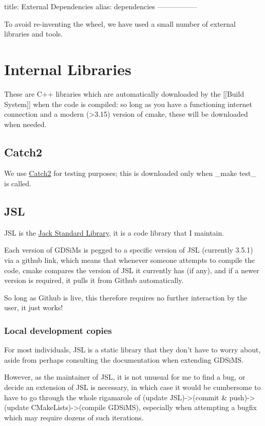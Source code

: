 title: External Dependencies
alias: dependencies
-----------------


To avoid re-inventing the wheel, we have used a small number of external libraries and tools.

\section{Internal Libraries}

	These are C++ libraries which are automatically downloaded by the [[Build System]] when the code is compiled: so long as you have a functioning internet connection and a modern (>3.15) version of cmake, these will be downloaded when needed.

	\subsection{Catch2}
		We use \href{https://github.com/catchorg/Catch2}{Catch2} for testing purposes; this is downloaded only when _make test_ is called.

	\subsection{JSL}
		JSL is the \href{https://github.com/DrFraserGovil/JSL}{Jack Standard Library}, it is a code library that I maintain.

		Each version of GDSiMs is pegged to a specific version of JSL (currently 3.5.1) via a github link, which means that whenever someone attempts to compile the code, cmake compares the version of JSL it currently has (if any), and if a newer version is required, it pulls it from Github automatically.

		So long as Github is live, this therefore requires no further interaction by the user, it just works!


		\subsubsection{Local development copies}

			For most individuals, JSL is a static library that they don't have to worry about, aside from perhaps consulting the documentation when extending GDSiMS.

			However, as the maintainer of JSL, it is not unusual for me to find a bug, or decide an extension of JSL is necessary, in which case it would be cumbersome to have to go through the whole rigamarole of (update JSL)->(commit \& push)->(update CMakeLists)->(compile GDSiMS), especially when attempting a bugfix which may require dozens of such iterations.

